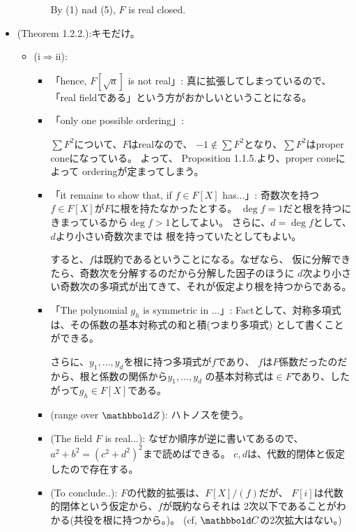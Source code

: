 \documentclass[9pt]{ltjsarticle}
\begin{document}
\begin{itemize}
\begin{itemize}
\begin{enumerate}
      By (1) nad (5), $F$ is real closed.
    \end{enumerate}
  \end{itemize}
  \item
  (Theorem 1.2.2.):キモだけ。
  \begin{itemize}
    \item (i$\Rightarrow$ii):
    \begin{itemize}
      \item 「hence, $F[\sqrt{a}]$ is not real」:
      真に拡張してしまっているので、「real fieldである」という方がおかしいということになる。
      \item 「only one possible ordering」:

      $\sum F^2$について、$F$はrealなので、
      $-1 \notin \sum F^2$となり、$\sum F^2$はproper coneになっている。
      よって、      Proposition 1.1.5.より、proper coneによって
      orderingが定まってしまう。
      \item
      「it remains to show that, if $f\in F[X]$ has...」:
      奇数次を持つ$f\in F[X]$が$F$に根を持たなかったとする。
      $\deg f=1$だと根を持つにきまっているから$\deg f >1$としてよい。
      さらに、$d=\deg f$として、$d$より小さい奇数次までは
      根を持っていたとしてもよい。

      すると、$f$は既約であるということになる。なぜなら、
      仮に分解できたら、奇数次を分解するのだから分解した因子のほうに
      $d$次より小さい奇数次の多項式が出てきて、それが仮定より根を持つからである。

      \item
      「The polynomial $g_h$ is symmetric in ...」:
      Factとして、対称多項式は、その係数の基本対称式の和と積(つまり多項式)
      として書くことができる。

      さらに、$y_1,\dots,y_d$を根に持つ多項式が$f$であり、
      $f$は$F$係数だったのだから、根と係数の関係から$y_1,\dots,y_d$
      の基本対称式は$\in F$であり、したがって$g_h\in F[X]$である。

      \item (range over $\Z$):
      ハトノスを使う。

      \item (The field $F$ is real...):
      なぜか順序が逆に書いてあるので、$a^2+b^2=(c^2+d^2)^2$まで読めばできる。
      $c,d$は、代数的閉体と仮定したので存在する。

      \item
      (To conclude..):
      $F$の代数的拡張は、$F[X]/(f)$だが、
      $F[i]$は代数的閉体という仮定から、$f$が既約ならそれは
      2次以下であることがわかる(共役を根に持つから。)。
      (cf, $\C$の2次拡大はない。)



\end{itemize}
\end{itemize}
\end{itemize}
\end{document}
